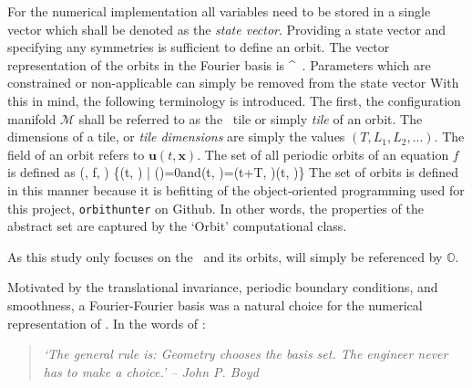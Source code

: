For the numerical implementation all variables need to
be stored in a single vector which shall be denoted as the \textit{state vector}. Providing a state
vector and specifying any symmetries is sufficient to define an orbit.
The vector representation of the orbits  in the Fourier basis is
\beq \label{e-statevector}
\statev {}^{\top} \,.
\eeq
Parameters which
are constrained or non-applicable can simply be removed from the state vector 
With this in mind, the following terminology is introduced. The first, the configuration manifold $\mathcal{M}$ shall be referred
to as the \spt\ tile or simply \textit{tile} of an orbit. The dimensions of a tile, or \textit{tile dimensions} are simply the
values $(T, L_1, L_2, ...)$. The field of an orbit refers to $\mathbf{u}(t, \mathbf{x})$. The set of all periodic orbits
of an equation $f$ is defined as
\beq \label{e-sptorbit}
(, f, ) \equiv \{(t, )\: | \: (\statev)=0\quad\mbox{and}\quad {}(t, )=(t+T, )\quad \forall (t, )\in {}\}
\eeq
The set of orbits  is defined in this manner because it is befitting of the object-oriented programming used
for this project, \texttt{orbithunter} on Github. In other words, the properties of the abstract set  are captured
by the `Orbit' computational class.

As this study only focuses on the \KSe\ and its orbits,  will simply be referenced by $\mathbb{O}$.

Motivated by the translational invariance, periodic boundary conditions, and smoothness,
a Fourier-Fourier basis was a natural choice for the numerical representation of \ufield.
In the words of :
\begin{quote}
\textit{`The general rule is: Geometry chooses the basis set. The engineer never has to make a choice.' -- John P. Boyd}
\end{quote}

